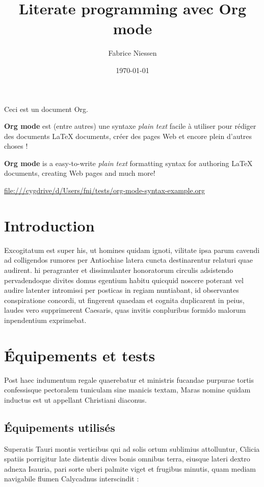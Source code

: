 \documentclass[french]{report}
\author{Fabrice Niessen}
\date{\today}
\title{Literate programming avec Org mode}
\begin{document}
\maketitle
Ceci est un document Org.

\textbf{Org mode} est (entre autres) une syntaxe \emph{plain text} facile à utiliser pour
rédiger des documents \LaTeX{} documents, créer des pages Web et encore plein
d'autres choses !

\textbf{Org mode} is a easy-to-write \emph{plain text} formatting syntax for authoring \LaTeX{}
documents, creating Web pages and much more!

\url{file:///cygdrive/d/Users/fni/tests/org-mode-syntax-example.org}

\chapter{Introduction}
\label{sec:org0980ec2}

Excogitatum est super his, ut homines quidam ignoti, vilitate ipsa parum cavendi
ad colligendos rumores per Antiochiae latera cuncta destinarentur relaturi quae
audirent. hi peragranter et dissimulanter honoratorum circulis adsistendo
pervadendoque divites domus egentium habitu quicquid noscere poterant vel audire
latenter intromissi per posticas in regiam nuntiabant, id observantes
conspiratione concordi, ut fingerent quaedam et cognita duplicarent in peius,
laudes vero supprimerent Caesaris, quas invitis conpluribus formido malorum
inpendentium exprimebat.

\chapter{Équipements et tests}
\label{sec:org0c6e83b}

Post haec indumentum regale quaerebatur et ministris fucandae purpurae tortis
confessisque pectoralem tuniculam sine manicis textam, Maras nomine quidam
inductus est ut appellant Christiani diaconus.

\section{Équipements utilisés}
\label{sec:org76a1d28}

Superatis Tauri montis verticibus qui ad solis ortum sublimius attolluntur,
Cilicia spatiis porrigitur late distentis dives bonis omnibus terra, eiusque
lateri dextro adnexa Isauria, pari sorte uberi palmite viget et frugibus
minutis, quam mediam navigabile flumen Calycadnus interscindit :
\end{document}
